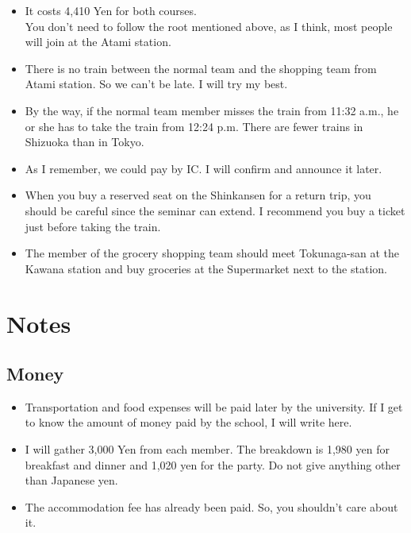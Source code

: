 \documentclass[unicode,a4paper,11pt]{ltjsarticle}
\begin{document}
\begin{itemize}
      \item
            It costs 4,410 Yen for both courses. \\
            You don't need to follow the root mentioned above, as I think, most people will join at the Atami station.
      \item
            There is no train between the normal team and the shopping team from Atami station. So we can't be late. I will try my best.
      \item
            By the way, if the normal team member misses the train from 11:32 a.m., he or she has to take the train from 12:24 p.m. There are fewer trains in Shizuoka than in Tokyo.
      \item
            As I remember, we could pay by IC. I will confirm and announce it later.
      \item
            When you buy a reserved seat on the Shinkansen for a return trip, you should be careful since the seminar can extend. I recommend you buy a ticket just before taking the train.
      \item
            The member of the grocery shopping team should meet Tokunaga-san at the Kawana station and buy groceries at the Supermarket next to the station.
\end{itemize}


\section{Notes}


\subsection*{Money}

\begin{itemize}
      \item
            Transportation and food expenses will be paid later by the university. If I get to know the amount of money paid by the school, I will write here.
      \item
            I will gather 3,000 Yen from each member. The breakdown is 1,980 yen for breakfast and dinner and 1,020 yen for the party. Do not give anything other than Japanese yen.
      \item
            The accommodation fee has already been paid. So, you shouldn't care about it.
\end{itemize}
\end{document}
